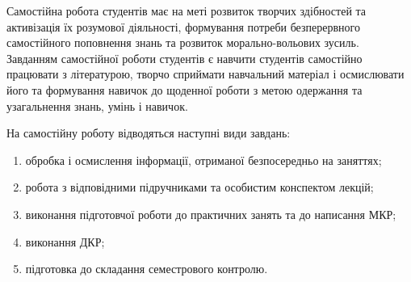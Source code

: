 \documentclass{Syllabus}
\begin{document}
%
%
%


Самостійна робота студентів має на меті розвиток творчих здібностей та активізація їх розумової діяльності, формування потреби безперервного самостійного поповнення знань та розвиток морально-вольових зусиль. Завданням самостійної роботи студентів є навчити студентів самостійно працювати з літературою, творчо сприймати навчальний матеріал і осмислювати його та формування навичок до щоденної роботи з метою одержання та узагальнення знань, умінь і навичок.


На самостійну роботу відводяться наступні види завдань:
\begin{enumerate}[label=$\bullet$]
	\item обробка і осмислення інформації, отриманої безпосередньо на заняттях;
	\item робота з відповідними підручниками та особистим конспектом лекцій;
	\item виконання підготовчої роботи до практичних занять та до написання МКР;
	\item виконання ДКР;
	\item підготовка до складання семестрового контролю.
\end{enumerate}
\end{document}
